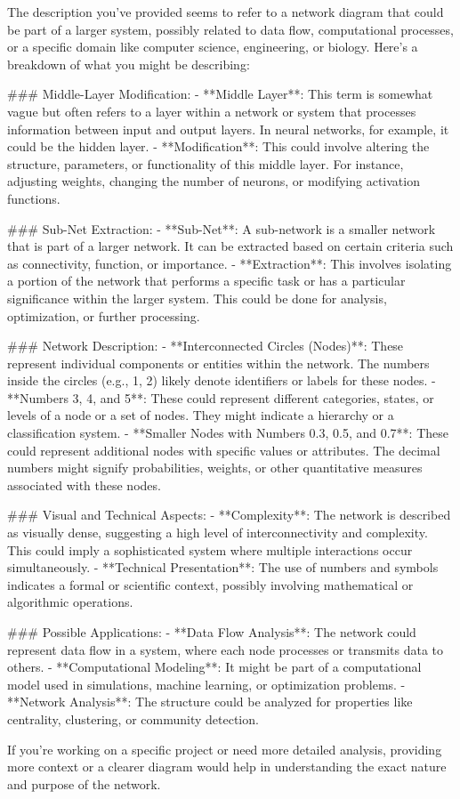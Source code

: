 The description you've provided seems to refer to a network diagram that could be part of a larger system, possibly related to data flow, computational processes, or a specific domain like computer science, engineering, or biology. Here's a breakdown of what you might be describing:

### Middle-Layer Modification:
- **Middle Layer**: This term is somewhat vague but often refers to a layer within a network or system that processes information between input and output layers. In neural networks, for example, it could be the hidden layer.
- **Modification**: This could involve altering the structure, parameters, or functionality of this middle layer. For instance, adjusting weights, changing the number of neurons, or modifying activation functions.

### Sub-Net Extraction:
- **Sub-Net**: A sub-network is a smaller network that is part of a larger network. It can be extracted based on certain criteria such as connectivity, function, or importance.
- **Extraction**: This involves isolating a portion of the network that performs a specific task or has a particular significance within the larger system. This could be done for analysis, optimization, or further processing.

### Network Description:
- **Interconnected Circles (Nodes)**: These represent individual components or entities within the network. The numbers inside the circles (e.g., 1, 2) likely denote identifiers or labels for these nodes.
- **Numbers 3, 4, and 5**: These could represent different categories, states, or levels of a node or a set of nodes. They might indicate a hierarchy or a classification system.
- **Smaller Nodes with Numbers 0.3, 0.5, and 0.7**: These could represent additional nodes with specific values or attributes. The decimal numbers might signify probabilities, weights, or other quantitative measures associated with these nodes.

### Visual and Technical Aspects:
- **Complexity**: The network is described as visually dense, suggesting a high level of interconnectivity and complexity. This could imply a sophisticated system where multiple interactions occur simultaneously.
- **Technical Presentation**: The use of numbers and symbols indicates a formal or scientific context, possibly involving mathematical or algorithmic operations.

### Possible Applications:
- **Data Flow Analysis**: The network could represent data flow in a system, where each node processes or transmits data to others.
- **Computational Modeling**: It might be part of a computational model used in simulations, machine learning, or optimization problems.
- **Network Analysis**: The structure could be analyzed for properties like centrality, clustering, or community detection.

If you're working on a specific project or need more detailed analysis, providing more context or a clearer diagram would help in understanding the exact nature and purpose of the network.